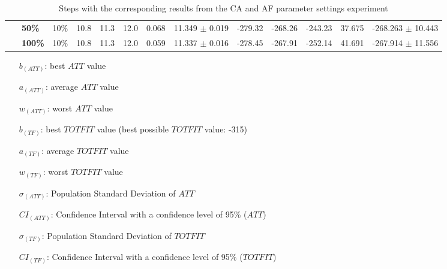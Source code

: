 \begin{sidewaystable}
\begin{tabular}{|l|l|l||c|c|c|c|c|c|c|c|c|c|}
    ~ & \textbf{50\%} & 10\% & 10.8 & 11.3 & 12.0 & 0.068 & 11.349 $\pm$ 0.019 & -279.32 & -268.26 & -243.23 & 37.675 & -268.263 $\pm$ 10.443 \\
    ~ & \textbf{100\%} & 10\% & 10.8 & 11.3 & 12.0 & 0.059 & 11.337 $\pm$ 0.016 & -278.45 & -267.91 & -252.14 & 41.691 & -267.914 $\pm$ 11.556 \\
    \hline
    \end{tabular}
    \caption {Steps with the corresponding results from the CA and AF parameter settings experiment}
    \tiny
    \begin{itemize}[noitemsep]
    \item[$b_{(ATT)}$:] best $ATT$ value
    \item[$a_{(ATT)}$:] average $ATT$ value
    \item[$w_{(ATT)}$:] worst $ATT$ value
    \item[$b_{(TF)}$:] best $TOTFIT$ value (best possible $TOTFIT$ value: -315)
    \item[$a_{(TF)}$:] average $TOTFIT$ value
    \item[$w_{(TF)}$:] worst $TOTFIT$ value
    \item[$\sigma_{(ATT)}$:] Population Standard Deviation of $ATT$
    \item[$CI_{(ATT)}$:] Confidence Interval with a confidence level of 95\% ($ATT$)
    \item[$\sigma_{(TF)}$:] Population Standard Deviation of $TOTFIT$
    \item[$CI_{(TF)}$:] Confidence Interval with a confidence level of 95\% ($TOTFIT$)
    \end{itemize}
    \label{table:pm2}
\end{sidewaystable}


